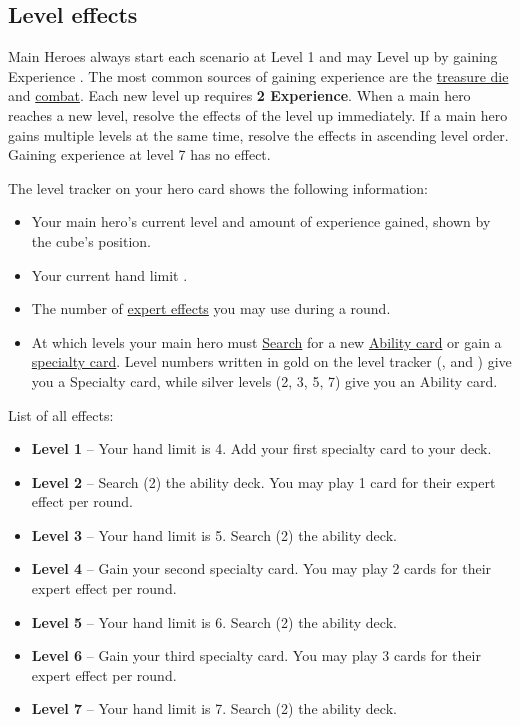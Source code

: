 \clearpage

\subsection*{\hypertarget{Level}{Level effects}}
Main Heroes always start each scenario at Level 1 and may Level up by gaining Experience .
The most common sources of gaining experience are the \hyperlink{Resources}{treasure die} and \hyperlink{Combatexperience}{combat}.
Each new level up requires \textbf{2 Experience}.
When a main hero reaches a new level, resolve the effects of the level up immediately.
If a main hero gains multiple levels at the same time, resolve the effects in ascending level order.
Gaining experience at level 7 has no effect.\par
The level tracker on your hero card shows the following information:
\begin{itemize}
\item Your main hero’s current level and amount of experience gained, shown by the cube's position.
\item Your current hand limit .
\item The number of \hyperlink{Ability}{expert effects}  you may use during a round.
\item At which levels your main hero must \hyperlink{Playerdecks}{Search} for a new \hyperlink{Ability}{Ability card} or gain a \hyperlink{Specialty}{specialty card}.
Level numbers written in gold on the level tracker (,  and ) give you a Specialty card, while silver levels (2, 3, 5, 7) give you an Ability card.
\end{itemize}
List of all effects:
\begin{itemize}
\item \textbf{Level 1} – Your hand limit is 4.
Add your first specialty card to your deck.
\item \textbf{Level 2} – Search (2) the ability deck.
You may play 1 card for their expert effect per round.
\item \textbf{Level 3} – Your hand limit is 5.
Search (2) the ability deck.
\item \textbf{Level 4} – Gain your second specialty card.
You may play 2 cards for their expert effect per round.
\item \textbf{Level 5} – Your hand limit is 6.
Search (2) the ability deck.
\item \textbf{Level 6} – Gain your third specialty card.
You may play 3 cards for their expert effect per round.
\item \textbf{Level 7} – Your hand limit is 7.
Search (2) the ability deck.
\end{itemize}
